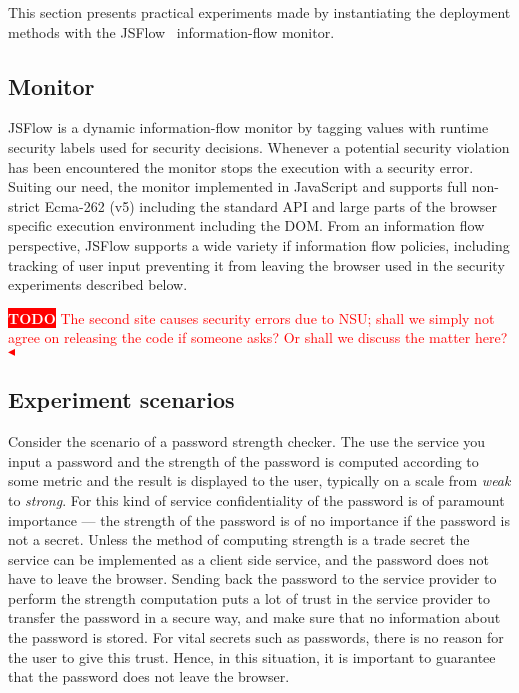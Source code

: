 \documentclass{llncs}
\newcommand{\todo}[1]{\colorbox{red}{\textcolor{white}{\sffamily\bfseries\scriptsize TODO}} \textcolor{red}{#1} \textcolor{red}{$\blacktriangleleft$}}
\begin{document}
This section presents practical experiments made by instantiating the deployment
methods with the JSFlow~\cite{Hedin:Sabelfeld:CSF12,JSFlow} information-flow monitor. 

\subsection{Monitor}

JSFlow is a dynamic information-flow monitor by tagging values with runtime
security labels used for security decisions. Whenever a potential security
violation has been encountered the monitor stops the execution with a security
error. Suiting our need, the monitor implemented in JavaScript and supports
full non-strict Ecma-262 (v5) including the standard API and large parts of the
browser specific execution environment including the DOM.  From an information
flow perspective, JSFlow supports a wide variety if information flow policies,
including tracking of user input preventing it from leaving the browser used in
the security experiments described below.

\todo{The second site causes security errors due to NSU; shall we simply not agree on releasing the code if someone asks? Or shall we discuss the matter here?}

\subsection{Experiment scenarios}

Consider the scenario of a password strength checker. The use the service
you input a password and the strength of the password is computed according
to some metric and the result is displayed to the user, typically on a scale
from \emph{weak} to \emph{strong}.
%
For this kind of service confidentiality of the password is of paramount importance --- 
the strength of the password is of no importance if the password is not a secret.
Unless the method of computing strength is a trade secret the service can be
implemented as a client side service, and the password does not have to leave the
browser. Sending back the password to the service provider to perform
the strength computation puts a lot of trust in the service provider to transfer the
password in a secure way, and make sure that no information about the password
is stored. For vital secrets such as passwords, there is no reason for the user
to give this trust. Hence, in this situation, it is important to guarantee that
the password does not leave the browser.
\end{document}
